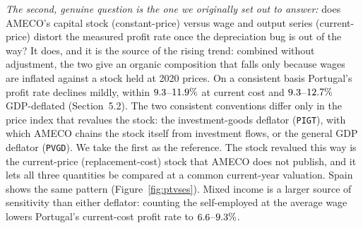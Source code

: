 \documentclass[11pt]{article}
\begin{document}
\emph{The second, genuine question is the one we originally set out to
answer:} does AMECO's capital stock (constant-price) versus wage and
output series (current-price) distort the measured profit rate once the
depreciation bug is out of the way? It does, and it is the source of the
rising trend: combined without adjustment, the two give an organic
composition that falls only because wages are inflated against a stock
held at 2020 prices. On a consistent basis Portugal's profit rate
declines mildly, within $9.3$--$11.9\%$ at current
cost and $9.3$--$12.7\%$ GDP-deflated
(Section~5.2). The two consistent conventions differ only in the price
index that revalues the stock: the investment-goods deflator
(\texttt{PIGT}), with which AMECO chains the stock itself from
investment flows, or the general GDP deflator (\texttt{PVGD}). We take
the first as the reference. The stock revalued this way is the
current-price (replacement-cost) stock that AMECO does not publish, and
it lets all three quantities be compared at a common current-year
valuation. Spain shows the same pattern (Figure~\ref{fig:ptvses}).
Mixed income is a larger source of sensitivity than either deflator:
counting the self-employed at the average wage lowers Portugal's
current-cost profit rate to $6.6$--$9.3\%$.
\end{document}
